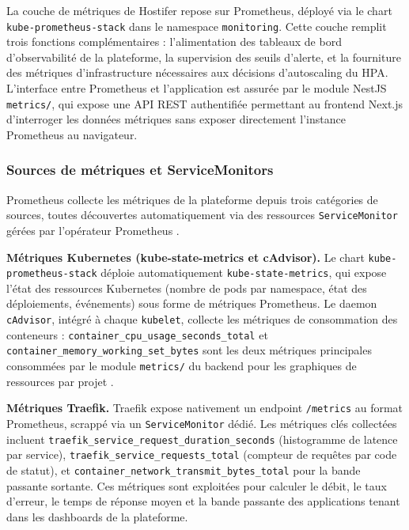 La couche de métriques de Hostifer repose sur Prometheus, déployé via le chart \texttt{kube-prometheus-stack} dans le namespace \texttt{monitoring}. Cette couche remplit trois fonctions complémentaires : l'alimentation des tableaux de bord d'observabilité de la plateforme, la supervision des seuils d'alerte, et la fourniture des métriques d'infrastructure nécessaires aux décisions d'autoscaling du HPA. L'interface entre Prometheus et l'application est assurée par le module NestJS \texttt{metrics/}, qui expose une API REST authentifiée permettant au frontend Next.js d'interroger les données métriques sans exposer directement l'instance Prometheus au navigateur.

\subsubsection*{Sources de métriques et ServiceMonitors}

Prometheus collecte les métriques de la plateforme depuis trois catégories de sources, toutes découvertes automatiquement via des ressources \texttt{ServiceMonitor} gérées par l'opérateur Prometheus \cite{prometheus-operator}.

\textbf{Métriques Kubernetes (kube-state-metrics et cAdvisor).} Le chart \texttt{kube-prometheus-stack} déploie automatiquement \texttt{kube-state-metrics}, qui expose l'état des ressources Kubernetes (nombre de pods par namespace, état des déploiements, événements) sous forme de métriques Prometheus. Le daemon \texttt{cAdvisor}, intégré à chaque \texttt{kubelet}, collecte les métriques de consommation des conteneurs : \texttt{container\_cpu\_usage\_seconds\_total} et \texttt{container\_memory\_working\_set\_bytes} sont les deux métriques principales consommées par le module \texttt{metrics/} du backend pour les graphiques de ressources par projet \cite{prometheus-operator}.

\textbf{Métriques Traefik.} Traefik expose nativement un endpoint \texttt{/metrics} au format Prometheus, scrappé via un \texttt{ServiceMonitor} dédié. Les métriques clés collectées incluent \texttt{traefik\_service\_request\_duration\_seconds} (histogramme de latence par service), \texttt{traefik\_service\_requests\_total} (compteur de requêtes par code de statut), et \texttt{container\_network\_transmit\_bytes\_total} pour la bande passante sortante. Ces métriques sont exploitées pour calculer le débit, le taux d'erreur, le temps de réponse moyen et la bande passante des applications tenant dans les dashboards de la plateforme.

